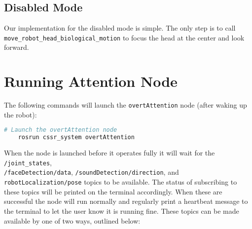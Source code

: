 \documentclass{CSSRforAfrica}
\begin{document}
\subsection{Disabled Mode}
Our implementation for the disabled mode is simple. The only step is to call\\ \texttt{move\_robot\_head\_biological\_motion} to focus the head at the center and look forward.

\pagebreak
\section{Running Attention Node}
The following commands will launch the \texttt{overtAttention} node (after waking up the robot):

\begin{lstlisting}[style=withoutNumbering, language=bash]
	# Launch the overtAttention node
	rosrun cssr_system overtAttention
\end{lstlisting}

When the node is launched before it operates fully it will wait for the \texttt{/joint\_states},\\ \texttt{/faceDetection/data}, \texttt{/soundDetection/direction}, and \texttt{robotLocalization/pose} topics to be available. The status of subscribing to these topics will be printed on the terminal accordingly. When these are successful the node will run normally and regularly print a heartbeat message to the terminal to let the user know it is running fine. These topics can be made available by one of two ways, outlined below:
\end{document}
